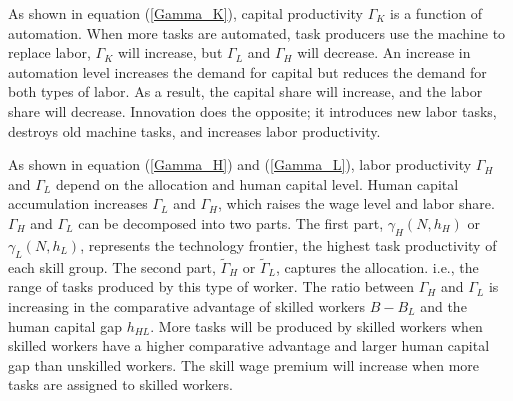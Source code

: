 \documentclass[12pt]{article}
\begin{document}
As shown in equation (\ref{Gamma_K}), capital productivity $\Gamma_K$ is a function of automation. When more tasks are automated, task producers use the machine to replace labor, $\Gamma_K$ will increase, but $\Gamma_L$ and $\Gamma_H$ will decrease. An increase in automation level increases the demand for capital but reduces the demand for both types of labor. As a result, the capital share will increase, and the labor share will decrease. Innovation does the opposite; it introduces new labor tasks, destroys old machine tasks, and increases labor productivity. 

As shown in equation (\ref{Gamma_H}) and (\ref{Gamma_L}), labor productivity $\Gamma_H$ and $\Gamma_L$ depend on the allocation and human capital level. Human capital accumulation increases $\Gamma_L$ and $\Gamma_H$, which raises the wage level and labor share. $\Gamma_H$ and $\Gamma_L$ can be decomposed into two parts. The first part, $\gamma_H(N,h_H)$ or $\gamma_L(N,h_L)$, represents the technology frontier, the highest task productivity of each skill group. The second part, $\tilde{\Gamma}_H$ or $\tilde{\Gamma}_L$, captures the allocation. i.e., the range of tasks produced by this type of worker. The ratio between $\Gamma_H$ and $\Gamma_L$ is increasing in the comparative advantage of skilled workers $B-B_L$ and the human capital gap $h_{HL}$. More tasks will be produced by skilled workers when skilled workers have a higher comparative advantage and larger human capital gap than unskilled workers. The skill wage premium will increase when more tasks are assigned to skilled workers. 
\end{document}
